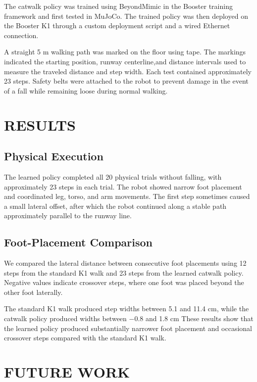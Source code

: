 \documentclass[letterpaper, 10 pt, conference]{ieeeconf}  %
\begin{document}
The catwalk policy was trained using BeyondMimic in the Booster training framework and first tested in MuJoCo. The trained policy was then deployed on the Booster K1 through a custom deployment script and a wired Ethernet connection.

A straight 5 m walking path was marked on the floor using tape. The markings indicated the starting position, runway centerline,and distance intervals used to measure the traveled distance and step width. Each test contained approximately 23 steps. Safety belts were attached to the robot to prevent damage in the event of a fall while remaining loose during normal walking.

\section{RESULTS}

\subsection{Physical Execution}

The learned policy completed all 20 physical trials without falling, with approximately 23 steps in each trial. The robot showed narrow foot placement and coordinated leg, torso, and arm movements. The first step sometimes caused a small lateral offset, after which the robot continued along a stable path approximately parallel to the runway line.

\subsection{Foot-Placement Comparison}

We compared the lateral distance between consecutive foot placements using 12 steps from the standard K1 walk and 23 steps from the learned catwalk policy. Negative values indicate crossover steps, where one foot was placed beyond the other foot laterally.

The standard K1 walk produced step widths between 5.1 and 11.4 cm, while the catwalk policy produced widths between $-0.8$ and 1.8 cm These results show that the learned policy produced substantially narrower foot placement and occasional crossover steps compared with the standard K1 walk.

\section{FUTURE WORK}
\end{document}
